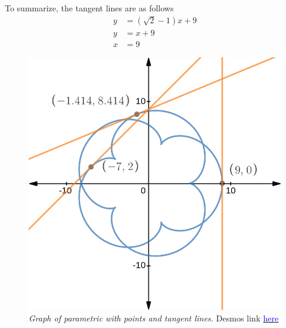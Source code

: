 \documentclass[12pt]{article}
\begin{document}
To summarize, the tangent lines are as follows
\begin{align}
  y & =\left(\sqrt{2}-1\right)x+9 \\
  y & =x+9                        \\
  x & =9
\end{align}
\begin{figure}[H]
  \begin{center}
    \includegraphics[scale=.3]{after.png}
    \caption{\textit{Graph of parametric with points and tangent lines.} Desmos link \href{https://www.desmos.com/calculator/lz7drdxhpy}{\textcolor{blue}{here}}}
  \end{center}
\end{figure}
\end{document}
